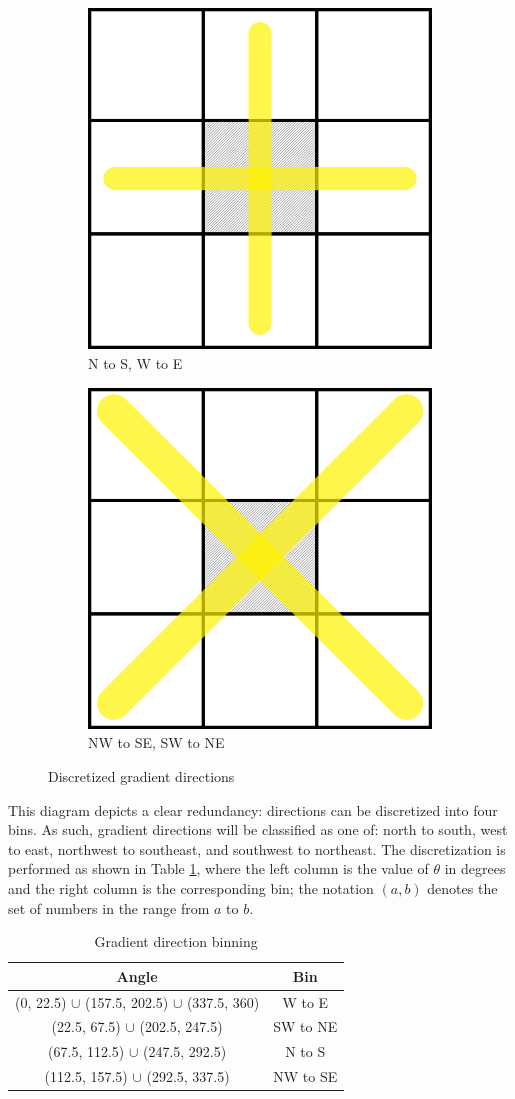 \begin{figure}
\centering
\begin{subfigure}{.5\textwidth}
  \centering
  \includegraphics[width=.4\linewidth]{Graphics/disc_grad_dir_cross.png}
  \caption{N to S, W to E}
  \label{fig:disc_grad_dir_cross}
\end{subfigure}%
\begin{subfigure}{.5\textwidth}
  \centering
  \includegraphics[width=.4\linewidth]{Graphics/disc_grad_dir_diag.png}
  \caption{NW to SE, SW to NE}
  \label{fig:disc_grad_dir_diag}
\end{subfigure}
\caption{Discretized gradient directions}
\label{fig:disc_grad_dir}
\end{figure}

This diagram depicts a clear redundancy: directions can be discretized
into four bins. As such, gradient directions will be classified as one of:
north to south, west to east, northwest to southeast, and southwest to 
northeast. The discretization is performed as shown in Table 
\ref{table:grad_discretization}, where the left column is the value
of $\theta$ in degrees and the right column is the corresponding bin;
the notation $(a,b)$ denotes the set of numbers in the range from $a$
to $b$. 

\begin{table}
\centering
\begin{tabular}{c|c}
Angle & Bin \\
\hline
(0, 22.5) $\cup$ (157.5, 202.5) $\cup$ (337.5, 360) & W to E \\
(22.5, 67.5) $\cup$ (202.5, 247.5) & SW to NE \\
(67.5, 112.5) $\cup$ (247.5, 292.5) & N to S \\
(112.5, 157.5) $\cup$ (292.5, 337.5) & NW to SE
\end{tabular}
\caption{Gradient direction binning}
\label{table:grad_discretization}
\end{table}

